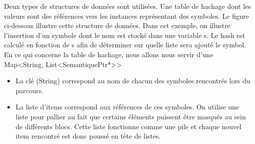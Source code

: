 \documentclass{../../res/univ-projet}
\begin{document}
    Deux types de structures de données sont utilisées. Une table de hachage dont les valeurs sont des références vers les instances représentant des symboles. Le figure ci-dessous illustre cette structure de données. Dans cet exemple, on illustre l'insertion d'un symbole dont le nom est stocké dans une variable s. Le hash est calculé en fonction de s afin de déterminer sur quelle liste sera ajouté le symbol.\\

     En ce qui concerne la table de hachage, nous allons nous servir d’une Map<String, List<SemantiquePtr*>>
      \begin{itemize}
        \item La clé (String) correspond au nom de chacun des symboles rencontrés lors du parcours.
        \item La liste d’items correspond aux références de ces symboles. On utilise une liste pour pallier au fait que certains éléments puissent être masqués au sein de différents blocs. Cette liste fonctionne comme une pile et chaque nouvel item rencontré est donc poussé en tête de listes.
      \end{itemize}

\end{document}
